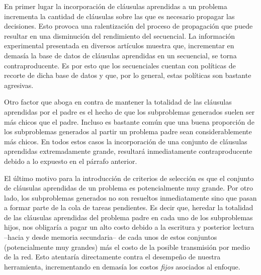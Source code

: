 En primer lugar la incorporación de cláusulas aprendidas a un problema
incrementa la cantidad de cláusulas sobre las que es necesario propagar las
decisiones. Esto provoca una ralentización del proceso de propagación que
puede resultar en una disminución del rendimiento del \ssolver secuencial. La
información experimental presentada en diversos artículos muestra que,
incrementar en demasía la base de datos de cláusulas aprendidas en un \ssolver
secuencial, se torna contraproducente. Es por esto que los \ssolvers
secuenciales cuentan con políticas de recorte de dicha base de datos y que,
por lo general, estas políticas son bastante agresivas.

Otro factor que aboga en contra de mantener la totalidad de las cláusulas
aprendidas por el padre es el hecho de que los subproblemas generados suelen
ser más chicos que el padre. Incluso es bastante común que una buena
proporción de los subproblemas generados al partir un problema padre sean
considerablemente más chicos. En todos estos casos la incorporación de una
conjunto de cláusulas aprendidas extremadamente grande, resultará
inmediatamente contraproducente debido a lo expuesto en el párrafo anterior.

El último motivo para la introducción de criterios de selección es que el
conjunto de cláusulas aprendidas de un problema es potencialmente muy grande.
Por otro lado, los subproblemas generados no son resueltos inmediatamente sino
que pasan a formar parte de la cola de tareas pendientes. Es decir que,
heredar la totalidad de las cláusulas aprendidas del problema padre en cada
uno de los subproblemas hijos, nos obligaría a pagar un alto costo debido a la
escritura y posterior lectura --hacia y desde memoria secundaria-- de cada
unos de estos conjuntos (potencialmente muy grandes) más el costo de la
posible transmisión por medio de la red. Esto atentaría directamente contra el
desempeño de nuestra herramienta, incrementando en demasía los costos
\emph{fijos} asociados al enfoque.


